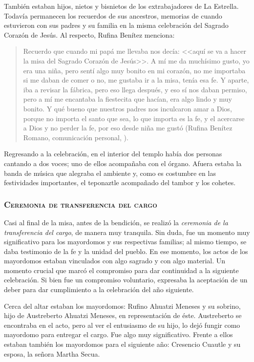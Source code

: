 \documentclass[14pt,letterpaper,twoside]{extbook} %
\begin{document}
También estaban hijos, nietos y bisnietos de los extrabajadores de La Estrella. Todavía permanecen los recuerdos de sus ancestros, memorias de cuando estuvieron con sus padres y su familia en la misma celebración del Sagrado Corazón de Jesús. Al respecto, Rufina Benítez menciona:

\begin{quotation}
\noindent Recuerdo que cuando mi papá me llevaba nos decía: <<aquí se va a hacer la misa del Sagrado Corazón de Jesús>>. A mí me da muchísimo gusto, yo era una niña, pero sentí algo muy bonito en mi corazón, no me importaba si me daban de comer o no, me gustaba ir a la misa, tenía esa fe. Y aparte, iba a revisar la fábrica, pero eso llega después, y eso sí nos daban permiso, pero a mí me encantaba la fiestecita que hacían, era algo lindo y muy bonito. Y qué bueno que nuestros padres nos inculcaron amar a Dios, porque no importa el santo que sea, lo que importa es la fe, y el acercarse a Dios y no perder la fe, por eso desde niña me gustó (Rufina Benítez Romano, comunicación personal, ).
\end{quotation}

\noindent Regresando a la celebración, en el interior del templo había dos personas cantando a dos voces; uno de ellos acompañaba con el órgano. Afuera estaba la banda de música que alegraba el ambiente y, como es costumbre en las festividades importantes, el teponaztle acompañado del tambor y los cohetes.

\subsubsection{\mdseries\textsc{Ceremonia de transferencia del cargo}}

\noindent Casi al final de la misa, antes de la bendición, se realizó la \textit{ceremonia de la transferencia del cargo}, de manera muy tranquila. Sin duda, fue un momento muy significativo para los mayordomos y sus respectivas familias; al mismo tiempo, se daba testimonio de la fe y la unidad del pueblo. En ese momento, los actos de los mayordomos estaban vinculados con algo sagrado y con algo material. Un momento crucial que marcó el compromiso para dar continuidad a la siguiente celebración. Si bien fue un compromiso voluntario, expresaba la aceptación de un deber para dar cumplimiento a la celebración del año siguiente.

Cerca del altar estaban los mayordomos: Rufino Ahuatzi Meneses y su sobrino, hijo de Austreberto Ahuatzi Meneses, en representación de éste. Austreberto se encontraba en el acto, pero al ver el entusiasmo de su hijo, lo dejó fungir como mayordomo para entregar el cargo. Fue algo muy significativo. Frente a ellos estaban también los mayordomos para el siguiente año: Cresencio Cuautle y su esposa, la señora Martha Secua.
\end{document}
